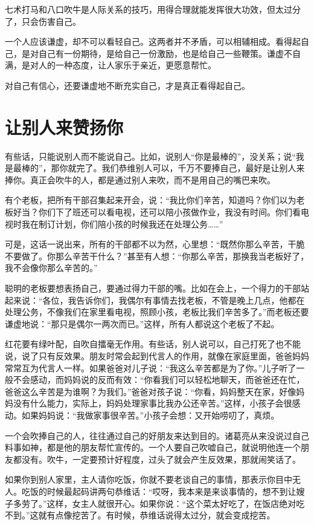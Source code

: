 \documentclass[fontset=fandol, a4paper, 12pt, openright]{ctexbook}
\begin{document}
七术打马和八口吹牛是人际关系的技巧，用得合理就能发挥很大功效，但太过分了，只会伤害自己。

一个人应该谦虚，却不可以看轻自己。这两者并不矛盾，可以相辅相成。看得起自己，是对自己有一份期待，是给自己一份激励，也是给自己一些鞭策。谦虚不自满，是对人的一种态度，让人家乐于亲近，更愿意帮忙。

对自己有信心，还要谦虚地不断充实自己，才是真正看得起自己。

\section{让别人来赞扬你}

有些话，只能说别人而不能说自己。比如，说别人“你是最棒的”，没关系；说“我是最棒的”，那你就完了。我们恭维别人可以，千万不要捧自己，最好是让别人来捧你。真正会吹牛的人，都是通过别人来吹，而不是用自己的嘴巴来吹。

有个老板，把所有干部召集起来开会，说：“我比你们辛苦，知道吗？你们以为老板好当？你们下了班还可以看电视，还可以陪小孩做作业，我没有时间。你们看电视时我在制订计划，你们陪小孩的时候我还在处理公务……”

可是，这话一说出来，所有的干部都不以为然，心里想：“既然你那么辛苦，干脆不要做了。你那么辛苦干什么？”甚至有人想：“你那么辛苦，那换我当老板好了，我不会像你那么辛苦的。”

聪明的老板要想表扬自己，要通过得力干部的嘴。比如在会上，一个得力的干部站起来说：“各位，我告诉你们，我偶尔有事情去找老板，不管是晚上几点，他都在处理公务，不像我们在家里看电视，照顾小孩，老板比我们辛苦多了。”而老板还要谦虚地说：“那只是偶尔一两次而已。”这样，所有人都说这个老板了不起。

红花要有绿叶配，自吹自擂毫无作用。有些话，别人说可以，自己打死了也不能说，说了只有反效果。朋友时常会起到代言人的作用，就像在家庭里面，爸爸妈妈常常互为代言人一样。如果爸爸对儿子说：“我这么辛苦都是为了你。”儿子听了一般不会感动，而妈妈说的反而有效：“你看我们可以轻松地聊天，而爸爸还在忙，爸爸这么辛苦是为谁啊？为我们。”爸爸对孩子说：“你看，妈妈整天在家，好像妈妈没有什么能力，实际上，妈妈处理家事比我办公还辛苦。”这样，小孩子会很感动。如果妈妈说：“我做家事很辛苦。”小孩子会想：又开始唠叨了，真烦。

一个会吹捧自己的人，往往通过自己的好朋友来达到目的。诸葛亮从来没说过自己料事如神，都是他的朋友帮忙宣传的。一个人要自己吹嘘自己，就说明他连一个朋友都没有。吹牛，一定要预计好程度，过头了就会产生反效果，那就闹笑话了。

如果你到别人家里，主人请你吃饭，你就不要老谈自己的事情，那表示你目中无人。吃饭的时候最起码讲两句恭维话：“哎呀，我本来是来谈事情的，想不到让嫂子多劳了。”这样，女主人就很开心。如果你说：“这个菜太好吃了，在饭店绝对吃不到。”这就有点像挖苦了。有时候，恭维话说得太过分，就会变成挖苦。
\end{document}
